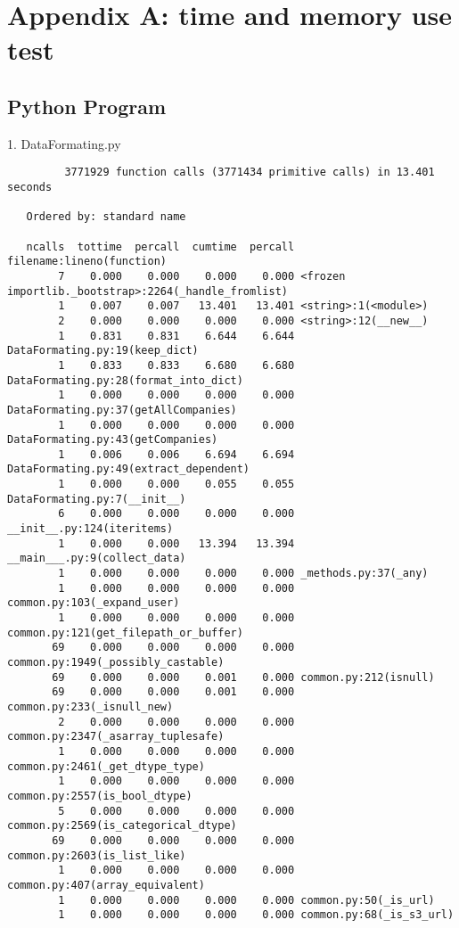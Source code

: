 \documentclass{article}
\begin{document}
\section*{Appendix A: time and memory use test}
\subsection*{Python Program}
1. DataFormating.py
\begin{verbatim}
         3771929 function calls (3771434 primitive calls) in 13.401 seconds

   Ordered by: standard name

   ncalls  tottime  percall  cumtime  percall filename:lineno(function)
        7    0.000    0.000    0.000    0.000 <frozen importlib._bootstrap>:2264(_handle_fromlist)
        1    0.007    0.007   13.401   13.401 <string>:1(<module>)
        2    0.000    0.000    0.000    0.000 <string>:12(__new__)
        1    0.831    0.831    6.644    6.644 DataFormating.py:19(keep_dict)
        1    0.833    0.833    6.680    6.680 DataFormating.py:28(format_into_dict)
        1    0.000    0.000    0.000    0.000 DataFormating.py:37(getAllCompanies)
        1    0.000    0.000    0.000    0.000 DataFormating.py:43(getCompanies)
        1    0.006    0.006    6.694    6.694 DataFormating.py:49(extract_dependent)
        1    0.000    0.000    0.055    0.055 DataFormating.py:7(__init__)
        6    0.000    0.000    0.000    0.000 __init__.py:124(iteritems)
        1    0.000    0.000   13.394   13.394 __main___.py:9(collect_data)
        1    0.000    0.000    0.000    0.000 _methods.py:37(_any)
        1    0.000    0.000    0.000    0.000 common.py:103(_expand_user)
        1    0.000    0.000    0.000    0.000 common.py:121(get_filepath_or_buffer)
       69    0.000    0.000    0.000    0.000 common.py:1949(_possibly_castable)
       69    0.000    0.000    0.001    0.000 common.py:212(isnull)
       69    0.000    0.000    0.001    0.000 common.py:233(_isnull_new)
        2    0.000    0.000    0.000    0.000 common.py:2347(_asarray_tuplesafe)
        1    0.000    0.000    0.000    0.000 common.py:2461(_get_dtype_type)
        1    0.000    0.000    0.000    0.000 common.py:2557(is_bool_dtype)
        5    0.000    0.000    0.000    0.000 common.py:2569(is_categorical_dtype)
       69    0.000    0.000    0.000    0.000 common.py:2603(is_list_like)
        1    0.000    0.000    0.000    0.000 common.py:407(array_equivalent)
        1    0.000    0.000    0.000    0.000 common.py:50(_is_url)
        1    0.000    0.000    0.000    0.000 common.py:68(_is_s3_url)

\end{verbatim}
\end{document}
